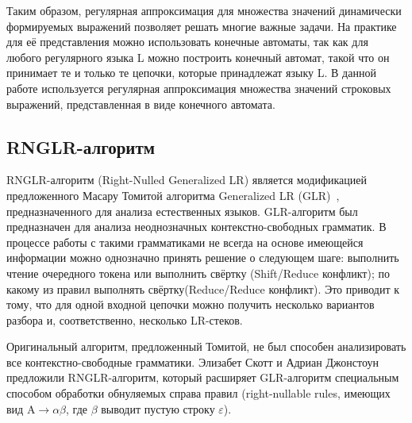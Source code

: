 Таким образом, регулярная аппроксимация для множества значений динамически формируемых выражений позволяет решать многие важные задачи. На практике для её представления можно использовать конечные автоматы, 
так как для любого регулярного языка L можно построить конечный автомат, такой что он принимает те и только те цепочки, которые принадлежат языку L. В данной работе используется регулярная аппроксимация 
множества значений строковых выражений, представленная в виде конечного автомата.

\subsection{RNGLR-алгоритм}
RNGLR-алгоритм (Right-Nulled Generalized LR) является модификацией предложенного Масару Томитой алгоритма Generalized LR (GLR)~\cite{Tomita}, предназначенного для анализа естественных языков. 
GLR-алгоритм был предназначен для анализа неоднозначных контекстно-свободных грамматик. В процессе работы с такими грамматиками не всегда на основе имеющейся информации можно однозначно принять решение 
о следующем шаге: выполнить чтение очередного токена или выполнить свёртку (Shift/Reduce конфликт); по какому из правил выполнять свёртку(Reduce/Reduce конфликт). Это приводит к тому, что для одной 
входной цепочки можно получить несколько вариантов разбора и, соответственно, несколько LR-стеков.  

Оригинальный алгоритм, предложенный Томитой, не был способен анализировать все контекстно-свободные грамматики. 
Элизабет Скотт и Адриан Джонстоун предложили RNGLR-алгоритм, который расширяет GLR-алгоритм специальным способом обработки обнуляемых справа 
правил (right-nullable rules, имеющих вид $\mathrm{A} \rightarrow \alpha \beta$, где $\beta$ выводит пустую строку $\varepsilon$).

